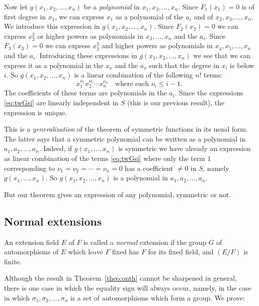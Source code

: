 \documentclass[11pt]{article}
\theoremstyle{definition}
\begin{document}
Now let $g(x_1, x_2, \ldots, x_n)$ be a \emph{polynomial} in $x_1, x_2, \ldots, x_n$.
Since $F_1(x_1) = 0$ is of first degree in $x_1$, we can express $x_1$ as a polynomial of the $a_i$ and of $x_2, x_3, \ldots, x_n$.
We introduce this expression in $g(x_1,x_2,\ldots,x_n)$.
Since $F_2(x_2) = 0$ we can express $x_2^2$ or higher powers as polynomials in $x_3, \ldots, x_n$ and the $a_i$.
Since $F_3(x_3) = 0$ we can express $x_3^3$ and higher powers as polynomials in $x_4, x_5, \ldots, x_n$ and the $a_i$.
Introducing these expressions in $g(x_1, x_2, \ldots, x_n)$ we see that we can express it as a polynomial in the $x_\nu$ and the $a_\nu$ such that the degree in $x_i$ is below $i$.
So $g(x_1, x_2, \ldots, x_n)$ is a linear combination of the following $n!$ terms:
\begin{equation}
\label{eq:twGsi}
x_1^{\nu_1} x_2^{\nu_2} \cdots x_n^{\nu_n}
\quad
\text{where each $\nu_i \leq i-1$.}
\end{equation}
The coefficients of these terms are polynomials in the $a_i$.
Since the expressions \eqref{eq:twGsi} are linearly independent in $S$ (this is our previous result), the expression is unique.

This is a \emph{generalization} of the theorem of symmetric functions in its usual form.
The latter says that a symmetric polynomial can be written as a polynomial in $a_1, a_2, \ldots, a_n$.
Indeed, if $g(x_1, \ldots, x_n)$ is symmetric we have already an expression as linear combination of the terms \eqref{eq:twGsi} where only the term $1$ corresponding to $\nu_1 = \nu_2 = \cdots = \nu_n = 0$ has a coefficient $\not= 0$ in $S$, namely $g(x_1, \ldots, x_n)$.
So $g(x_1, x_2, \ldots, x_n)$ is a polynomial in $a_1, a_2, \ldots, a_n$.

But our theorem gives an expression of any polynomial, symmetric or not.



\subsection{Normal extensions}

An extension field $E$ of $F$ is called a \emph{normal} extension if the group $G$ of automorphisms of $E$ which leave $F$ fixed has $F$ for its fixed field, and $(E/F)$ is finite.

Although the result in Theorem~\ref{theo:onth} cannot be sharpened in general, there is one case in which the equality sign will always occur, namely, in the case in which $\sigma_1, \sigma_2, \ldots, \sigma_n$ is a set of automorphisms which form a group.
We prove:
\end{document}
